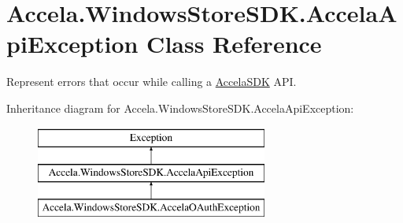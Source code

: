 \hypertarget{class_accela_1_1_windows_store_s_d_k_1_1_accela_api_exception}{\section{Accela.\+Windows\+Store\+S\+D\+K.\+Accela\+Api\+Exception Class Reference}
\label{class_accela_1_1_windows_store_s_d_k_1_1_accela_api_exception}
}


Represent errors that occur while calling a \hyperlink{class_accela_1_1_windows_store_s_d_k_1_1_accela_s_d_k}{Accela\+S\+D\+K} A\+P\+I.  


Inheritance diagram for Accela.\+Windows\+Store\+S\+D\+K.\+Accela\+Api\+Exception\+:\begin{figure}[H]
\begin{center}
\leavevmode
\includegraphics[height=3.000000cm]{class_accela_1_1_windows_store_s_d_k_1_1_accela_api_exception}
\end{center}
\end{figure}
